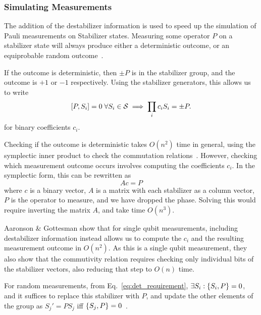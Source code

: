 \subsubsection*{Simulating Measurements}
The addition of the destabilizer information is  used to speed up the simulation of Pauli measurements on Stabilizer states. Measuring some operator $P$ on a stabilizer state will always produce either a deterministic outcome, or an equiprobable random outcome~\cite{Gottesman1998b}.\par
If the outcome is deterministic, then $\pm P$ is in the stabilizer group, and the outcome is $+1$ or $-1$ respectively. Using the stabilizer generators, this allows us to write 
\begin{equation}
    \comm{P}{S_{i}}=0\;\forall S_{i}\in\mathcal{S} \implies \prod_{i}c_{i}S_{i} = \pm P. \label{eq:det_requirement}
\end{equation}
for binary coefficients $c_{i}$.\par
Checking if the outcome is deterministic takes $O(n^{2})$ time in general, using the symplectic inner product to check the commutation relations~\cite{Dehaene2003}. However, checking which measurement outcome occurs involves computing the coefficients $c_{i}$. In the symplectic form, this can be rewritten as
\[
    Ac=P
\]
where $c$ is a binary vector, $A$ is a matrix with each stabilizer as a column vector, $P$ is the operator to measure, and we have dropped the phase. Solving this would require inverting the matrix $A$, and take time $O(n^{3})$.\par
Aaronson \& Gottesman show that for single qubit measurements, including destabilizer information instead allows us to compute the $c_{i}$ and the resulting measurement outcome in $O(n^{2})$. As this is a single qubit measurement, they also show that the commutivity relation requires checking only individual bits of the stabilizer vectors, also reducing that step to $O(n)$ time.\par
For random measurements, from Eq.~\ref{eq:det_requirement}, $\exists S_{i}:\acomm{S_{i}}{P}=0$, and it suffices to replace this stabilizer with $P$, and update the other elements of the group as $S_{j}'=PS_{j}$ iff $\acomm{S_{j}}{P}=0$~\cite{Gottesman1998b,Aaronson2004}.
